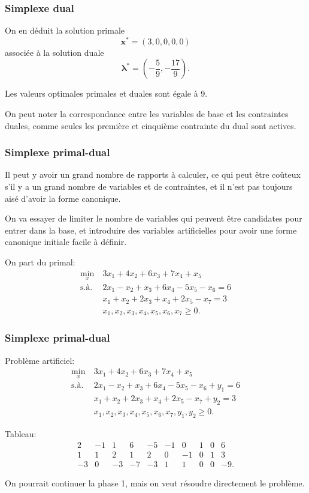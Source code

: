 \documentclass[t,usepdftitle=false]{beamer}
\def\bx{\boldsymbol{x}}
\def\blambda{\boldsymbol{\lambda}}
\begin{document}
\begin{frame}
\frametitle{Simplexe dual}

On en déduit la solution primale
\[
\bx^* = ( 3, 0, 0 ,0, 0)
\]
associée à la solution duale
\[
\blambda^* = \left( -\frac{5}{9}, -\frac{17}{9} \right).
\]

\mbox{}

Les valeurs optimales primales et duales sont égale à 9.

\mbox{}

On peut noter la correspondance entre les variables de base et les contraintes duales, comme seules les première et cinquième contrainte du dual sont actives.
\end{frame}

\begin{frame}
\frametitle{Simplexe primal-dual}

Il peut y avoir un grand nombre de rapports à calculer, ce qui peut être coûteux s'il y a un grand nombre de variables et de contraintes, et il n'est pas toujours aisé d'avoir la forme canonique.

\mbox{}

On va essayer de limiter le nombre de variables qui peuvent être candidates pour entrer dans la base, et introduire des variables artificielles pour avoir une forme canonique initiale facile à définir.

\mbox{}

On part du primal: 
\begin{align*}
\min_{x}\ & 3x_1 + 4x_2 + 6x_3 + 7x_4 + x_5 \\
\mbox{s.à. } & 2x_1 - x_2 + x_3 +6x_4 - 5x_5 - x_6 = 6 \\
& x_1 + x_2 + 2x_3 + x_4 + 2x_5 - x_7 = 3 \\
& x_1, x_2, x_3, x_4, x_5, x_6, x_7 \geq 0.
\end{align*}

\end{frame}

\begin{frame}
\frametitle{Simplexe primal-dual}

Problème artificiel: 
\begin{align*}
\min_{x}\ & 3x_1 + 4x_2 + 6x_3 + 7x_4 + x_5 \\
\mbox{s.à. } & 2x_1 - x_2 + x_3 +6x_4 - 5x_5 - x_6 + y_1 = 6 \\
& x_1 + x_2 + 2x_3 + x_4 + 2x_5 - x_7 + y_2 = 3 \\
& x_1, x_2, x_3, x_4, x_5, x_6, x_7, y_1, y_2 \geq 0.
\end{align*}

\mbox{}

Tableau:
\[
\begin{matrix}
2 & -1 & 1 & 6 & -5 & -1 & 0 & 1 & 0 & 6 \\
1 & 1 & 2 & 1 & 2 & 0 & -1 & 0 & 1 & 3 \\
-3 & 0 & -3 & -7 & -3 & 1 & 1 & 0 & 0 & -9.
\end{matrix}
\]

On pourrait continuer la phase 1, mais on veut résoudre directement le problème. 

\end{frame}
\end{document}
